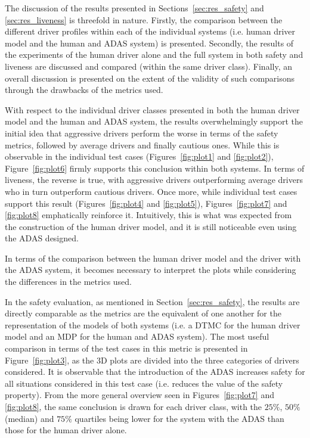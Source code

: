 The discussion of the results presented in Sections~\ref{sec:res_safety} and \ref{sec:res_liveness} is threefold in nature. Firstly, the comparison between the different driver profiles within each of the individual systems (i.e. human driver model and the human and ADAS system) is presented. Secondly, the results of the experiments of the human driver alone and the full system in both safety and liveness are discussed and compared (within the same driver class). Finally, an overall discussion is presented on the extent of the validity of such comparisons through the drawbacks of the metrics used.

With respect to the individual driver classes presented in both the human driver model and the human and ADAS system, the results overwhelmingly support the initial idea that aggressive drivers perform the worse in terms of the safety metrics, followed by average drivers and finally cautious ones. While this is observable in the individual test cases (Figures~\ref{fig:plot1} and \ref{fig:plot2}), Figure~\ref{fig:plot6} firmly supports this conclusion within both systems. In terms of liveness, the reverse is true, with aggressive drivers outperforming average drivers who in turn outperform cautious drivers. Once more, while individual test cases support this result (Figures~\ref{fig:plot4} and \ref{fig:plot5}), Figures~\ref{fig:plot7} and \ref{fig:plot8} emphatically reinforce it. Intuitively, this is what was expected from the construction of the human driver model, and it is still noticeable even using the ADAS designed.

In terms of the comparison between the human driver model and the driver with the ADAS system, it becomes necessary to interpret the plots while considering the differences in the metrics used. 

In the safety evaluation, as mentioned in Section~\ref{sec:res_safety}, the results are directly comparable as the metrics are the equivalent of one another for the representation of the models of both systems (i.e. a DTMC for the human driver model and an MDP for the human and ADAS system). The most useful comparison in terms of the test cases in this metric is presented in Figure~\ref{fig:plot3}, as the 3D plots are divided into the three categories of drivers considered. It is observable that the introduction of the ADAS increases safety for all situations considered in this test case (i.e. reduces the value of the safety property). From the more general overview seen in Figures~\ref{fig:plot7} and \ref{fig:plot8}, the same conclusion is drawn for each driver class, with the $25\%$, $50\%$ (median) and $75\%$ quartiles being lower for the system with the ADAS than those for the human driver alone. 

